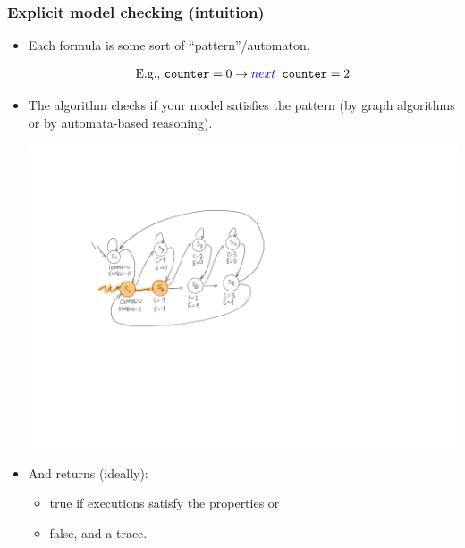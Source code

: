 \documentclass[usenames,dvipsnames]{beamer}
\begin{document}
\begin{frame}
  \frametitle{Explicit model checking (intuition)}
  
  \begin{itemize}
  \item Each formula is some sort of ``pattern''/automaton.
  
  \[ \text{E.g., } \texttt{counter}=0 \rightarrow \tc{blue}{next} \texttt{ counter}=2 \]
  
  \pause
  
  \item The algorithm checks if your model satisfies the pattern (by graph algorithms or by automata-based reasoning).
  
  \begin{center}
\includegraphics[scale=.3]{fsm-counter}
  \end{center}
  \pause
  \item And returns (ideally):
\begin{itemize}
  \item true if  executions satisfy the properties or
  \item false, and a  trace.
\end{itemize}

  \end{itemize}
\end{frame}
\end{document}
